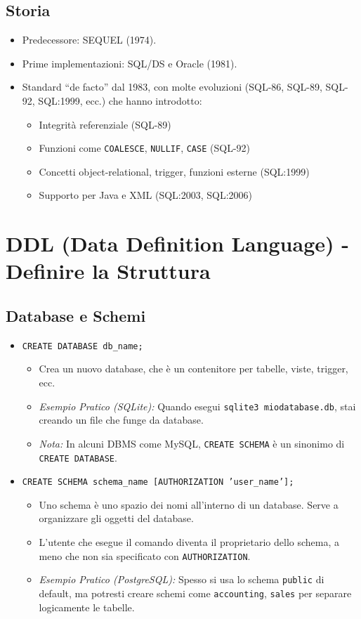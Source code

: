 \documentclass{article}
\begin{document}
	\subsection{Storia}
	\begin{itemize}
		\item Predecessore: SEQUEL (1974).
		\item Prime implementazioni: SQL/DS e Oracle (1981).
		\item Standard ``de facto'' dal 1983, con molte evoluzioni (SQL-86, SQL-89, SQL-92, SQL:1999, ecc.) che hanno introdotto:
		\begin{itemize}
			\item Integrità referenziale (SQL-89)
			\item Funzioni come \texttt{COALESCE}, \texttt{NULLIF}, \texttt{CASE} (SQL-92)
			\item Concetti object-relational, trigger, funzioni esterne (SQL:1999)
			\item Supporto per Java e XML (SQL:2003, SQL:2006)
		\end{itemize}
	\end{itemize}
	
	\section{DDL (Data Definition Language) - Definire la Struttura}
	
	\subsection{Database e Schemi}
	\begin{itemize}
		\item \texttt{CREATE DATABASE db\_name;}
		\begin{itemize}
			\item Crea un nuovo database, che è un contenitore per tabelle, viste, trigger, ecc.
			\item \textit{Esempio Pratico (SQLite):} Quando esegui \texttt{sqlite3 miodatabase.db}, stai creando un file che funge da database.
			\item \textit{Nota:} In alcuni DBMS come MySQL, \texttt{CREATE SCHEMA} è un sinonimo di \texttt{CREATE DATABASE}.
		\end{itemize}
		\item \texttt{CREATE SCHEMA schema\_name [AUTHORIZATION 'user\_name'];}
		\begin{itemize}
			\item Uno schema è uno spazio dei nomi all'interno di un database. Serve a organizzare gli oggetti del database.
			\item L'utente che esegue il comando diventa il proprietario dello schema, a meno che non sia specificato con \texttt{AUTHORIZATION}.
			\item \textit{Esempio Pratico (PostgreSQL):} Spesso si usa lo schema \texttt{public} di default, ma potresti creare schemi come \texttt{accounting}, \texttt{sales} per separare logicamente le tabelle.
		\end{itemize}
	\end{itemize}
	
\end{document}
